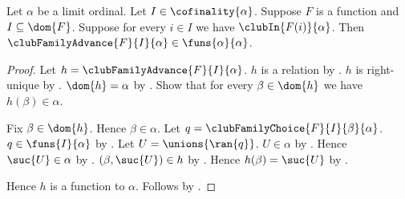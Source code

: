 \begin{theorem}\label{club_family_advance_type}
    Let $\alpha$ be a limit ordinal.
    Let $I\in\cofinality{\alpha}$.
    Suppose $F$ is a function and $I\subseteq\dom{F}$.
    Suppose for every $i\in I$ we have $\clubIn{F(i)}{\alpha}$.
    Then $\clubFamilyAdvance{F}{I}{\alpha}
        \in\funs{\alpha}{\alpha}$.
\end{theorem}
\begin{proof}
    Let $h=\clubFamilyAdvance{F}{I}{\alpha}$.
    $h$ is a relation by .
    $h$ is right-unique
        by .
    $\dom{h}=\alpha$
        by .
    Show that for every $\beta\in\dom{h}$ we have $h(\beta)\in\alpha$.
    \begin{subproof}
        Fix $\beta\in\dom{h}$.
        Hence $\beta\in\alpha$.
        Let $q=\clubFamilyChoice{F}{I}{\beta}{\alpha}$.
        $q\in\funs{I}{\alpha}$ by .
        Let $U=\unions{\ran{q}}$.
        $U\in\alpha$ by .
        Hence $\suc{U}\in\alpha$ by .
        $(\beta,\suc{U})\in h$ by .
        Hence $h(\beta)=\suc{U}$ by .
    \end{subproof}
    Hence $h$ is a function to $\alpha$.
    Follows by .
\end{proof}

